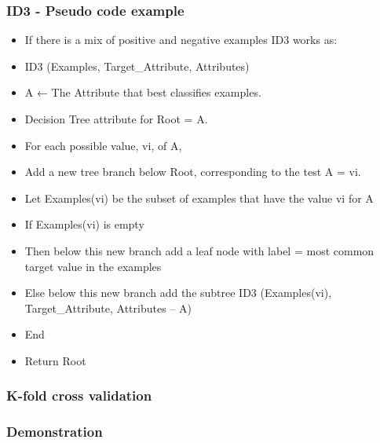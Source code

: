 \documentclass{beamer}
\begin{document}
\begin{frame}
\frametitle{ID3 - Pseudo code example}
\begin{itemize}
	\item If there is a mix of positive and negative examples ID3 works as:
	\item ID3 (Examples, Target_Attribute, Attributes)
      \item   A ← The Attribute that best classifies examples.
       \item  Decision Tree attribute for Root = A.
       \item  For each possible value, vi, of A,
          \item   Add a new tree branch below Root, corresponding to the test A = vi.
            \item Let Examples(vi) be the subset of examples that have the value vi for A
            \item If Examples(vi) is empty
              \item   Then below this new branch add a leaf node with label = most common target value in the examples
           \item  Else below this new branch add the subtree ID3 (Examples(vi), Target_Attribute, Attributes – {A})
   \item  End
   \item  Return Root

	\end{itemize}
\end{frame}



\begin{frame}
\frametitle{K-fold cross validation}

\end{frame}

\begin{frame}
\frametitle{Demonstration}

\end{frame}
\end{document}
